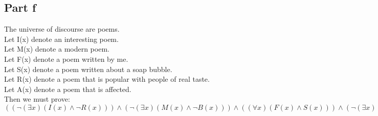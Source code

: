 \documentclass{article}
\begin{document}
		\subsection{Part f}
		The universe of discourse are poems. \\
		Let I(x) denote an interesting poem. \\
		Let M(x) denote a modern poem. \\
		Let F(x) denote a poem written by me. \\
		Let S(x) denote a poem written about a soap bubble. \\
		Let R(x) denote a poem that is popular with people of real taste. \\
		Let A(x) denote a poem that is affected. \\
		Then we must prove: $((\lnot(\exists x)(I(x) \land \lnot R(x))) \land (\lnot(\exists x)(M(x) \land \lnot B(x))) \land ((\forall x)(F(x) \land S(x))) \land (\lnot(\exists x)(\lnot M(x) \land S(x)))) \Rightarrow ((\forall x)(F(x) \land \lnot I(x)))$ \\
\end{document}
